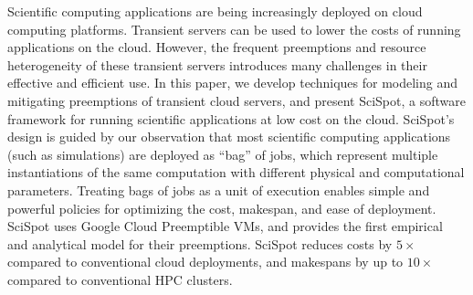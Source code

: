 Scientific computing applications are being increasingly deployed on cloud computing platforms.
Transient servers can be used to lower the costs of running applications on the cloud.
However, the frequent preemptions and resource heterogeneity of these transient servers introduces many challenges in their effective and efficient use.
In this paper, we develop techniques for modeling and mitigating preemptions of transient cloud servers, and present SciSpot, a software framework for running scientific applications at low cost on the cloud.
SciSpot's design is guided by our observation that most  scientific computing applications (such as simulations) are deployed as ``bag'' of jobs, which represent multiple instantiations of the same computation with different physical and computational parameters.
Treating bags of jobs as a unit of execution enables simple and powerful policies for optimizing the cost, makespan, and ease of deployment. 
SciSpot uses Google Cloud Preemptible VMs, and provides the first empirical and analytical model for their preemptions. 
SciSpot reduces costs by $5\times$ compared to conventional cloud deployments, and makespans by up to $10\times$ compared to conventional HPC clusters.







